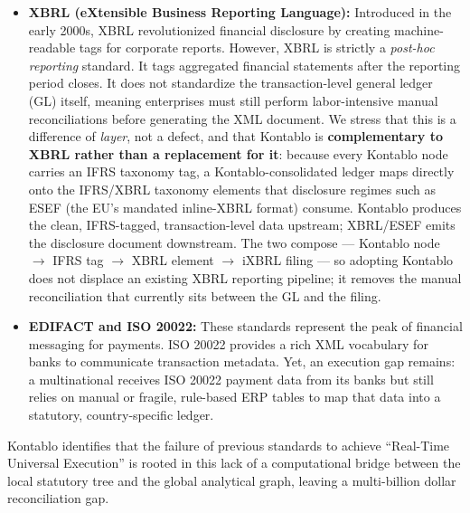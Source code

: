 \begin{itemize}
    \item \textbf{XBRL (eXtensible Business Reporting Language):} Introduced in the early 2000s, XBRL revolutionized financial disclosure by creating machine-readable tags for corporate reports. However, XBRL is strictly a \textit{post-hoc reporting} standard. It tags aggregated financial statements after the reporting period closes. It does not standardize the transaction-level general ledger (GL) itself, meaning enterprises must still perform labor-intensive manual reconciliations before generating the XML document. We stress that this is a difference of \emph{layer}, not a defect, and that Kontablo is \textbf{complementary to XBRL rather than a replacement for it}: because every Kontablo node carries an IFRS taxonomy tag, a Kontablo-consolidated ledger maps directly onto the IFRS/XBRL taxonomy elements that disclosure regimes such as ESEF (the EU's mandated inline-XBRL format) consume. Kontablo produces the clean, IFRS-tagged, transaction-level data upstream; XBRL/ESEF emits the disclosure document downstream. The two compose --- Kontablo node $\rightarrow$ IFRS tag $\rightarrow$ XBRL element $\rightarrow$ iXBRL filing --- so adopting Kontablo does not displace an existing XBRL reporting pipeline; it removes the manual reconciliation that currently sits between the GL and the filing.
    \item \textbf{EDIFACT and ISO 20022:} These standards represent the peak of financial messaging for payments. ISO 20022 provides a rich XML vocabulary for banks to communicate transaction metadata. Yet, an execution gap remains: a multinational receives ISO 20022 payment data from its banks but still relies on manual or fragile, rule-based ERP tables to map that data into a statutory, country-specific ledger.
\end{itemize}



Kontablo identifies that the failure of previous standards to achieve ``Real-Time Universal Execution'' is rooted in this lack of a computational bridge between the local statutory tree and the global analytical graph, leaving a multi-billion dollar reconciliation gap.

